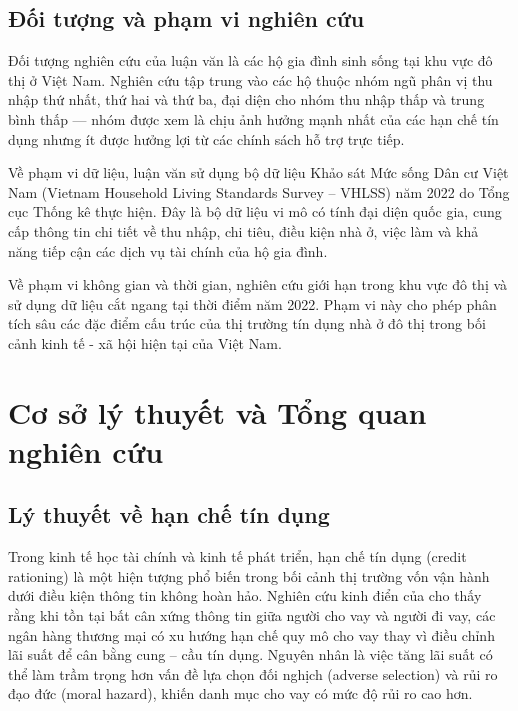 \documentclass[12pt,a4paper]{report}
\begin{document}
	\section{Đối tượng và phạm vi nghiên cứu}
	
	Đối tượng nghiên cứu của luận văn là các hộ gia đình sinh sống tại khu vực đô thị ở Việt Nam. Nghiên cứu tập trung vào các hộ thuộc nhóm ngũ phân vị thu nhập thứ nhất, thứ hai và thứ ba, đại diện cho nhóm thu nhập thấp và trung bình thấp --- nhóm được xem là chịu ảnh hưởng mạnh nhất của các hạn chế tín dụng nhưng ít được hưởng lợi từ các chính sách hỗ trợ trực tiếp.
	
	Về phạm vi dữ liệu, luận văn sử dụng bộ dữ liệu Khảo sát Mức sống Dân cư Việt Nam (Vietnam Household Living Standards Survey -- VHLSS) năm 2022 do Tổng cục Thống kê thực hiện. Đây là bộ dữ liệu vi mô có tính đại diện quốc gia, cung cấp thông tin chi tiết về thu nhập, chi tiêu, điều kiện nhà ở, việc làm và khả năng tiếp cận các dịch vụ tài chính của hộ gia đình.
	
	Về phạm vi không gian và thời gian, nghiên cứu giới hạn trong khu vực đô thị và sử dụng dữ liệu cắt ngang tại thời điểm năm 2022. Phạm vi này cho phép phân tích sâu các đặc điểm cấu trúc của thị trường tín dụng nhà ở đô thị trong bối cảnh kinh tế - xã hội hiện tại của Việt Nam.
		
	\chapter{Cơ sở lý thuyết và Tổng quan nghiên cứu}
	
	\section{Lý thuyết về hạn chế tín dụng}
	
	Trong kinh tế học tài chính và kinh tế phát triển, hạn chế tín dụng (credit rationing) là một hiện tượng phổ biến trong bối cảnh thị trường vốn vận hành dưới điều kiện thông tin không hoàn hảo. Nghiên cứu kinh điển của \textcite{Stiglitz1981} cho thấy rằng khi tồn tại bất cân xứng thông tin giữa người cho vay và người đi vay, các ngân hàng thương mại có xu hướng hạn chế quy mô cho vay thay vì điều chỉnh lãi suất để cân bằng cung – cầu tín dụng. Nguyên nhân là việc tăng lãi suất có thể làm trầm trọng hơn vấn đề lựa chọn đối nghịch (adverse selection) và rủi ro đạo đức (moral hazard), khiến danh mục cho vay có mức độ rủi ro cao hơn.
	
\end{document}
